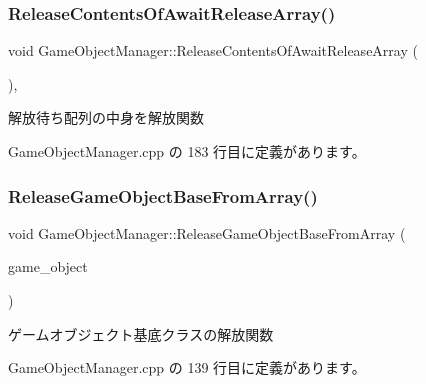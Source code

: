 \subsubsection{\texorpdfstring{Release\+Contents\+Of\+Await\+Release\+Array()}{ReleaseContentsOfAwaitReleaseArray()}}
{\footnotesize\ttfamily void Game\+Object\+Manager\+::\+Release\+Contents\+Of\+Await\+Release\+Array (\begin{DoxyParamCaption}{ }\end{DoxyParamCaption})\hspace{0.3cm}{\ttfamily [static]}, {\ttfamily [private]}}



解放待ち配列の中身を解放関数 



 Game\+Object\+Manager.\+cpp の 183 行目に定義があります。

\mbox{\label{class_game_object_manager_a83342c1c358e32f6478ae3428fcb25fa}} 
\subsubsection{\texorpdfstring{Release\+Game\+Object\+Base\+From\+Array()}{ReleaseGameObjectBaseFromArray()}}
{\footnotesize\ttfamily void Game\+Object\+Manager\+::\+Release\+Game\+Object\+Base\+From\+Array (\begin{DoxyParamCaption}\item[{\mbox{\hyperlink{class_game_object_base}{Game\+Object\+Base}} $\ast$}]{game\+\_\+object }\end{DoxyParamCaption})\hspace{0.3cm}{\ttfamily [static]}}



ゲームオブジェクト基底クラスの解放関数 



 Game\+Object\+Manager.\+cpp の 139 行目に定義があります。

\mbox{\label{class_game_object_manager_a4c6cdb6d0a1f43a2e2e705677fa2f5f6}} 
